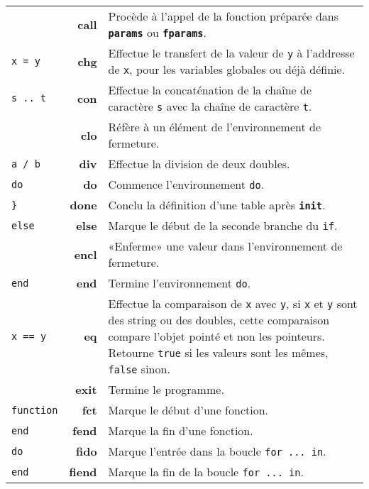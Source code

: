 \documentclass{article}
\begin{document}
\begin{longtable}{p{1.3cm} r p{12cm}}
   & \textbf{call} & Procède à l'appel de la fonction préparée dans \texttt{\textbf{params}} ou \texttt{\textbf{fparams}}.\\
  {\lstinline$x = y$} & \textbf{chg} & Effectue le transfert de la valeur de \texttt{y} à l'addresse de \texttt{x}, pour les variables globales ou déjà définie.\\
  {\lstinline$s .. t$} & \textbf{con} & Effectue la concaténation de la chaîne de caractère \texttt{s} avec la chaîne de caractère \texttt{t}.\\
   & \textbf{clo} & Réfère à un élément de l'environnement de fermeture.\\
  {\lstinline$a / b$} & \textbf{div} & Effectue la division de deux doubles.\\
  {\lstset{style=lua}\lstinline$do$} & \textbf{do} & Commence l'environnement {\lstset{style=lua}\lstinline$do$}.\\
  {\lstset{style=lua}\lstinline$}$} & \textbf{done} & Conclu la définition d'une table après \texttt{\textbf{init}}.\\
  {\lstset{style=lua}\lstinline$else$} & \textbf{else} & Marque le début de la seconde branche du {\lstset{style=lua}\lstinline$if$}.\\
   & \textbf{encl} & «Enferme» une valeur dans l'environnement de fermeture.\\
  {\lstset{style=lua}\lstinline$end$} & \textbf{end} & Termine l'environnement {\lstset{style=lua}\lstinline$do$}.\\
  {\lstinline$x == y$} & \textbf{eq} & Effectue la comparaison de \texttt{x} avec \texttt{y}, si \texttt{x} et \texttt{y} sont des string ou des doubles, cette comparaison compare l'objet pointé et non les pointeurs. Retourne {\lstset{style=lua}\lstinline$true$} si les valeurs sont les mêmes, {\lstset{style=lua}\lstinline$false$} sinon.\\
  & \textbf{exit} & Termine le programme.\\
  {\lstset{style=lua}\lstinline$function$} & \textbf{fct} & Marque le début d'une fonction.\\
  {\lstset{style=lua}\lstinline$end$} & \textbf{fend} & Marque la fin d'une fonction.\\
  {\lstset{style=lua}\lstinline$do$} & \textbf{fido} & Marque l'entrée dans la boucle {\lstset{style=lua}\lstinline$for ... in$}.\\
  {\lstset{style=lua}\lstinline$end$} & \textbf{fiend} & Marque la fin de la boucle {\lstset{style=lua}\lstinline$for ... in$}.\\

\end{longtable}
\end{document}
